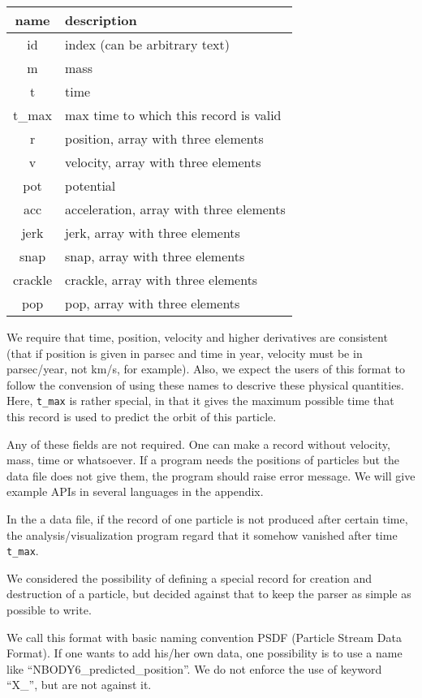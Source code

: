 \documentclass[5p,authoryear]{elsarticle}
\begin{document}
\begin{center}
\begin{tabular}{|c|l|}
\hline
name & description\\
\hline
id & index (can be arbitrary text)\\
m & mass\\
t & time\\
t\_max & max time to which this record is valid \\
r  & position, array with three elements\\
v  & velocity, array with three elements\\
pot  & potential\\
acc  & acceleration, array with three elements\\
jerk  & jerk, array with three elements\\
snap  & snap, array with three elements\\
crackle  & crackle, array with three elements\\
pop  & pop, array with three elements\\
\hline
\end{tabular}
\end{center}

We require that time, position, velocity and higher derivatives are
consistent (that if position is given in parsec and time in year,
velocity must be in parsec/year, not km/s, for example). Also, we
expect the users of this format to follow the convension of using
these names to descrive these physical quantities. Here, {\tt t\_max}
is rather special, in that it gives the maximum possible time that
this record is used to predict the orbit of this particle.

Any of these fields are not required. One can make a record without
velocity, mass, time or whatsoever. If a program needs the positions
of particles but the data file does not give them, the program should
raise error message. We will give example APIs in several languages in
the appendix.

In the a data file, if the record of one particle is not produced
after certain time, the analysis/visualization program regard that it
somehow vanished after time {\tt t\_max}.

We considered the possibility of defining a special record for
creation and destruction of a particle, but decided against that to
keep the parser as simple as possible to write.

We call this format with basic naming convention PSDF (Particle Stream
Data Format). If one wants to add his/her own data, one possibility is
to use a name like ``NBODY6\_predicted\_position''. We do not enforce
the use of keyword  ``X\_'', but are not against it.
\end{document}
